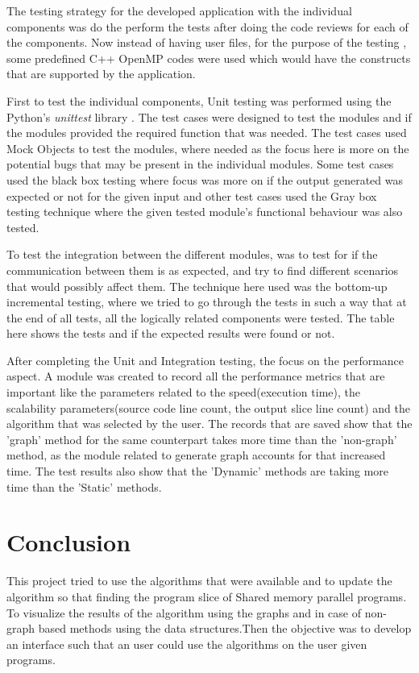 \documentclass[conference]{IEEEtran}
\begin{document}
The testing strategy for the developed application with the individual components was do the perform the tests after doing the code reviews for each of the components. Now instead of having user files, for the purpose of the testing , some predefined C++ OpenMP codes were used which would have the constructs that are supported by the application. 
\par First to test the individual components, Unit testing was performed using the Python's \emph{unittest} library . The test cases were designed to test the modules and if the modules provided the required function that was needed. The test cases used Mock Objects to test the modules, where needed as the focus here is more on the potential bugs that may be present in the individual modules. Some test cases used the black box testing where focus was more on if the output generated was expected or not for the given input and other test cases used the Gray box testing technique where the given tested module's functional behaviour was also tested.
\par To test the integration between the different modules, was to test for if the communication between them is as expected, and try to find different scenarios that would possibly affect them. The technique here used was the bottom-up incremental testing, where we tried to go through the tests in such a way that at the end of all tests, all the logically related components were tested. The table here shows the tests and if the expected results were found or not.

\par After completing the Unit and Integration testing, the focus on the performance aspect. A module was created to record all the performance metrics  that are important like the parameters related to the speed(execution time), the scalability parameters(source code line count, the output slice line count) and the algorithm that was selected by the user. The records that are saved show that the 'graph' method for the same counterpart takes more time than the 'non-graph' method, as the module related to generate graph accounts for that increased time. The test results also show that the 'Dynamic' methods are taking more time than the 'Static' methods. 

\section{Conclusion}
\par This project tried to use the algorithms that were available and to update the algorithm so that finding the program slice of Shared memory parallel programs. To visualize the results of the algorithm using the graphs and in case of non-graph based methods using the data structures.Then the objective was to develop an interface such that an user could use the algorithms on the user given programs. 
\end{document}
